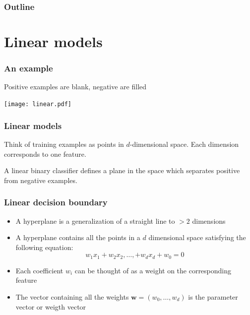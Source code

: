 \documentclass[14pt,mathserif,dvipsnames,usenames]{beamer}
\author[Chrupala and Stroppa]{Grzegorz Chrupa{\l}a and Nicolas Stroppa}
\institute[UdS] %
{
Saarland University\\
Google
}
\date[2010] %
{META Workshop}
\newcommand{\w}{\mathbf{w}}
\newcommand{\voc}[1]{{\color{ForestGreen}#1}}
\begin{document}
\frame{\titlepage}

\begin{frame}
  \frametitle{Outline}
  \tableofcontents
\end{frame}

\section{Linear models}

\begin{frame}
\frametitle{An example}
Positive examples are blank, negative are filled
\begin{center}
\vskip -0.5cm 
\texttt{[image: linear.pdf]}
\end{center}
\end{frame}

\begin{frame}
  \frametitle{Linear models}
  \begin{block}{}
    Think of \voc{training examples} as points in $d$-dimensional
    space. Each dimension corresponds to one \voc{feature}.
  \end{block}
  \begin{block}{}
    A linear binary classifier defines a plane in the space which
    separates \voc{positive} from \voc{negative} examples. 
  \end{block}
\end{frame}

\begin{frame}
 \frametitle{Linear decision boundary}
\begin{itemize}
\item A \voc{hyperplane} is a generalization of a straight line to
  $>2$ dimensions
\item A hyperplane contains all the points in a $d$ dimensional space satisfying the following equation:
\[
 w_1x_1 + w_2x_2, \ldots, + w_dx_d + w_0 = 0
\]
\item Each coefficient $w_i$ can be thought of as a weight on the
  corresponding feature
\item The vector containing all the weights $\w = (w_0,\ldots,w_d)$ is the
  \voc{parameter vector} or \voc{weigth vector}
\end{itemize}
\end{frame}
\end{document}
